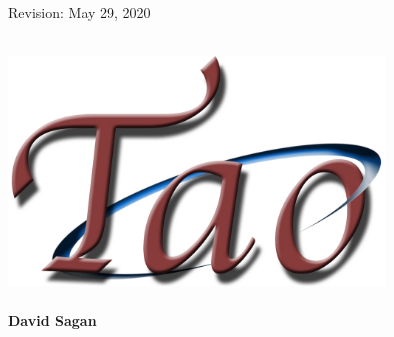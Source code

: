 \thispagestyle{empty}

\begin{flushright}
\large
Revision: May 29, 2020 \\
\end{flushright}

\vfill


{
\begin{center}
 \\
\vskip 0.2in
\includegraphics[width=10cm]{tao-logo.pdf} \\
\vskip 0.3in
 \\
\vskip 0.4in
{\huge \sf\bf David Sagan} \\
\end{center}
}

\vfill
\break
